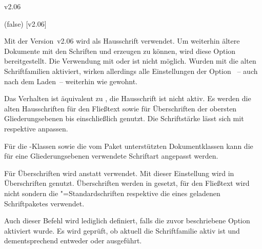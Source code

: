 \begin{Cessations}{v2.06}
\begin{Declaration}
  {}
  (false)
  [v2.06]
\printdeclarationlist

Mit der Version~v2.06 wird \OpenSans als Hausschrift verwendet. Um weiterhin 
ältere Dokumente mit den Schriften \Univers und \DIN erzeugen zu können, wird 
diese Option bereitgestellt.
Die Verwendung mit  oder  ist nicht 
möglich. Wurden mit  die alten Schriftfamilien aktiviert, 
wirken allerdings alle Einstellungen der Option ~-- auch nach 
dem Laden~-- weiterhin wie gewohnt.
%
\begin{DeclareValues}{}
  Das Verhalten ist äquivalent zu , die Hausschrift ist 
  nicht aktiv.
  Es werden die alten Hausschriften \Univers für den Fließtext sowie \DIN für 
  Überschriften der obersten Gliederungsebenen bis einschließlich 
   genutzt. Die Schriftstärke lässt sich mit 
   respektive  anpassen.
\end{DeclareValues}

Für die \TUDScript-Klassen sowie die vom Paket  
unterstützten Dokumentklassen kann die für eine Gliederungsebenen verwendete 
Schriftart angepasst werden.
%
\begin{DeclareValues}{}
  Für Überschriften wird \Univers anstatt \DIN verwendet.
  Mit dieser Einstellung wird \DIN in Überschriften genutzt. 
  Überschriften werden in \DIN gesetzt, für den Fließtext wird nicht \Univers 
  sondern die "=Standardschriften respektive die eines geladenen 
  Schriftpaketes verwendet.
\end{DeclareValues}
\end{Declaration}

\begin{Cessation}
  {}
\printdeclarationlist

Auch dieser Befehl wird lediglich definiert, falls die zuvor beschriebene 
Option  aktiviert wurde. Es wird geprüft, ob aktuell die 
Schriftfamilie \DIN aktiv ist und dementsprechend entweder  
oder  ausgeführt. 
\end{Cessation}


\end{Cessations}
